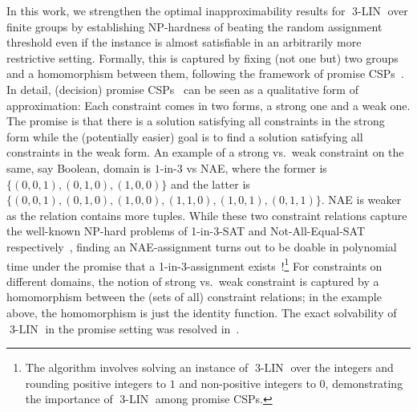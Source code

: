 \documentclass[a4paper,11pt]{article}
\theoremstyle{definition}
\newcommand{\eq}{\ensuremath{\operatorname{3-LIN}}}
\begin{document}
\medskip

In this work, we strengthen the optimal inapproximability results for $\eq$ over
finite groups by establishing NP-hardness of beating the random assignment threshold even if the instance is almost
satisfiable in an arbitrarily more restrictive setting. Formally, this is
captured by fixing (not one but) two groups and a homomorphism between
them, following the framework of promise CSPs~\cite{AGH17,BBKO21}. 
In detail, (decision) promise CSPs~\cite{BBKO21} can be seen as a qualitative
form of approximation: Each constraint comes in two forms, a strong one and a
weak one. The promise is that there is a solution satisfying all constraints in
the strong form while the (potentially easier) goal is to find a solution
satisfying all constraints in the weak form. An example of a strong vs.\ weak
constraint on the same, say Boolean, domain is $1$-in-$3$ vs NAE, where the former is $\{(0,0,1),(0,1,0),(1,0,0)\}$ and the latter is $\{(0,0,1),(0,1,0),(1,0,0),(1,1,0),(1,0,1),(0,1,1)\}$. NAE is weaker as the relation contains more tuples. 
While these two constraint relations capture the well-known NP-hard problems of
1-in-3-SAT and Not-All-Equal-SAT respectively~\cite{Schaefer78:stoc}, finding an
NAE-assignment turns out to be doable in polynomial time under the promise that
a 1-in-3-assignment exists~\cite{BG21}!\footnote{The algorithm involves solving
an instance of $\eq$ over the integers and rounding positive integers to $1$ and
non-positive integers to $0$, demonstrating the importance of $\eq$ among
promise CSPs.}
For constraints on different domains, the notion of strong vs.\ weak constraint is captured by a homomorphism between the (sets of all) constraint relations; in the example above, the homomorphism is just the identity function.
The exact solvability of $\eq$ in the promise setting was resolved in~\cite{LZ25:tocl}.
\end{document}
